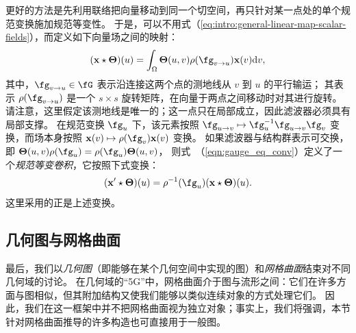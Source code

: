 更好的方法是先利用联络把向量移动到同一个切空间，再只针对某一点处的单个规范变换施加规范等变性。
于是，可以不用式（\ref{eq:intro:general-linear-map-scalar-fields}），而定义如下向量场之间的映射：
\begin{equation}
    (\mathbf{x} \star \boldsymbol{\Theta})(u) = \int_\Omega \boldsymbol{\Theta}(u, v) \rho(\fg_{v \rightarrow u}) \mathbf{x}(v) \mathrm{d}v,\label{eqn:gauge_eq_conv}
\end{equation}
其中，$\fg_{v \rightarrow u} \in \fG$ 表示沿连接这两个点的测地线从 $v$ 到 $u$ 的平行输运；
%
其表示 $\rho(\fg_{v \rightarrow u})$ 是一个 $s \times s$ 旋转矩阵，在向量于两点之间移动时对其进行旋转。
%
请注意，这里假定该测地线是唯一的；这一点只在局部成立，因此滤波器必须具有局部支撑。
%
%
在规范变换 $\fg_u$ 下，该元素按照 $\fg_{u \rightarrow v} \mapsto \fg_u^{-1} \fg_{u \rightarrow v} \fg_v$ 变换，而场本身按照 $\mathbf{x}(v) \mapsto \rho(\fg_v) \mathbf{x}(v)$ 变换。
如果滤波器与结构群表示可交换，即 $\boldsymbol{\Theta}(u, v) \rho(\fg_u) = \rho(\fg_u) \boldsymbol{\Theta}(u, v)$，%
则式~（\ref{eqn:gauge_eq_conv}）定义了一个{\em 规范等变卷积}，它按照下式变换：
$$ 
(\mathbf{x}' \star \boldsymbol{\Theta})(u) = \rho^{-1}(\fg_u) (\mathbf{x} \star \boldsymbol{\Theta})(u). 
$$ 
这里采用的正是上述变换。%







\subsection{几何图与网格曲面}
\label{sec:meshes}

最后，我们以{\em 几何图}（即能够在某个几何空间中实现的图）和{\em 网格曲面}结束对不同几何域的讨论。
%
%
在几何域的“5G”中，网格曲面介于图与流形之间：它们在许多方面与图相似，但其附加结构又使我们能够以类似连续对象的方式处理它们。
%
因此，我们在这一框架中并不把网格曲面视为独立对象；事实上，我们将强调，本节针对网格曲面推导的许多构造也可直接用于一般图。
%




